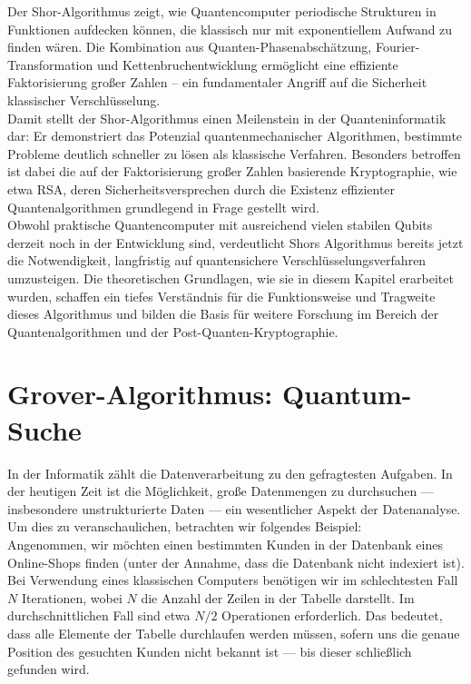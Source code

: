 Der Shor-Algorithmus zeigt, wie Quantencomputer periodische Strukturen in Funktionen aufdecken können, die klassisch nur mit exponentiellem Aufwand zu finden wären. Die Kombination aus Quanten-Phasenabschätzung, Fourier-Transformation und Kettenbruchentwicklung ermöglicht eine effiziente Faktorisierung großer Zahlen – ein fundamentaler Angriff auf die Sicherheit klassischer Verschlüsselung.\\

Damit stellt der Shor-Algorithmus einen Meilenstein in der Quanteninformatik dar: Er demonstriert das Potenzial quantenmechanischer Algorithmen, bestimmte Probleme deutlich schneller zu lösen als klassische Verfahren. Besonders betroffen ist dabei die auf der Faktorisierung großer Zahlen basierende Kryptographie, wie etwa RSA, deren Sicherheitsversprechen durch die Existenz effizienter Quantenalgorithmen grundlegend in Frage gestellt wird.\\

Obwohl praktische Quantencomputer mit ausreichend vielen stabilen Qubits derzeit noch in der Entwicklung sind, verdeutlicht Shors Algorithmus bereits jetzt die Notwendigkeit, langfristig auf quantensichere Verschlüsselungsverfahren umzusteigen. Die theoretischen Grundlagen, wie sie in diesem Kapitel erarbeitet wurden, schaffen ein tiefes Verständnis für die Funktionsweise und Tragweite dieses Algorithmus und bilden die Basis für weitere Forschung im Bereich der Quantenalgorithmen und der Post-Quanten-Kryptographie.

\section{Grover-Algorithmus: Quantum-Suche}
\label{sec:grover-algorithm}
In der Informatik zählt die Datenverarbeitung zu den gefragtesten Aufgaben. In der heutigen Zeit ist die Möglichkeit, große Datenmengen zu durchsuchen — insbesondere unstrukturierte Daten — ein wesentlicher Aspekt der Datenanalyse. Um dies zu veranschaulichen, betrachten wir folgendes Beispiel:\\ 

Angenommen, wir möchten einen bestimmten Kunden in der Datenbank eines Online-Shops finden (unter der Annahme, dass die Datenbank nicht indexiert ist). Bei Verwendung eines klassischen Computers benötigen wir im schlechtesten Fall $N$ Iterationen, wobei $N$ die Anzahl der Zeilen in der Tabelle darstellt. Im durchschnittlichen Fall sind etwa $N/2$ Operationen erforderlich. Das bedeutet, dass alle Elemente der Tabelle durchlaufen werden müssen, sofern uns die genaue Position des gesuchten Kunden nicht bekannt ist — bis dieser schließlich gefunden wird.\\


